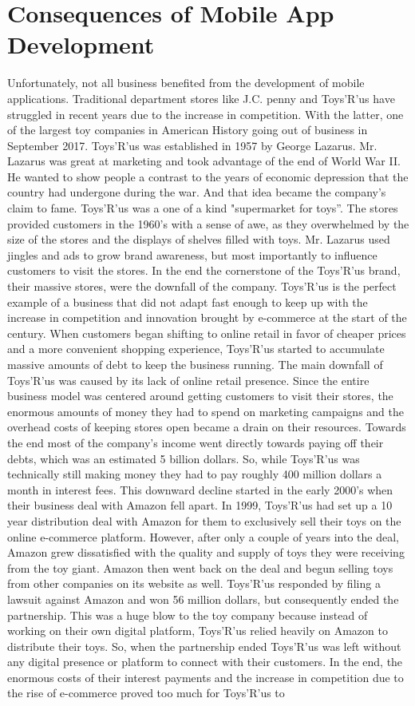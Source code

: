 \documentclass{article}
\begin{document}
\section{Consequences of Mobile App Development}
Unfortunately, not all business benefited from the development of mobile applications. Traditional department stores like J.C. penny and Toys'R'us have struggled in recent years due to the increase in competition. With the latter, one of the largest toy companies in American History going out of business in September 2017. Toys'R'us was established in 1957 by George Lazarus. Mr. Lazarus was great at marketing and took advantage of the end of World War II. He wanted to show people a contrast to the years of economic depression that the country had undergone during the war.  And that idea became the company’s claim to fame. Toys'R’us was a one of a kind "supermarket for toys”. The stores provided customers in the 1960’s with a sense of awe, as they overwhelmed by the size of the stores and the displays of shelves filled with toys. Mr. Lazarus used jingles and ads to grow brand awareness, but most importantly to influence customers to visit the stores. In the end the cornerstone of the Toys'R'us brand, their massive stores, were the downfall of the company. Toys'R'us is the perfect example of a business that did not adapt fast enough to keep up with the increase in competition and innovation brought by e-commerce at the start of the century. When customers began shifting to online retail in favor of cheaper prices and a more convenient shopping experience, Toys’R’us started to accumulate massive amounts of debt to keep the business running. The main downfall of Toys’R’us was caused by its lack of online retail presence. Since the entire business model was centered around getting customers to visit their stores, the enormous amounts of money they had to spend on marketing campaigns and the overhead costs of keeping stores open became a drain on their resources. Towards the end most of the company’s income went directly towards paying off their debts, which was an estimated 5 billion dollars. So, while Toys’R’us was technically still making money they had to pay roughly 400 million dollars a month in interest fees. This downward decline started in the early 2000’s when their business deal with Amazon fell apart. In 1999, Toys’R’us had set up a 10 year distribution deal with Amazon for them to exclusively sell their toys on the online e-commerce platform. However, after only a couple of years into the deal, Amazon grew dissatisfied with the quality and supply of toys they were receiving from the toy giant. Amazon then went back on the deal and begun selling toys from other companies on its website as well. Toys’R’us responded by filing a lawsuit against Amazon and won 56 million dollars, but consequently ended the partnership. This was a huge blow to the toy company because instead of working on their own digital platform, Toys'R'us relied heavily on Amazon to distribute their toys. So, when the partnership ended Toys’R’us was left without any digital presence or platform to connect with their customers. In the end, the enormous costs of their interest payments and the increase in competition due to the rise of e-commerce proved too much for Toys’R’us to 
\end{document}
